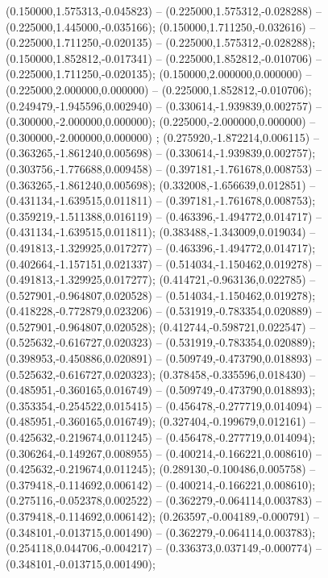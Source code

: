  (0.150000,1.575313,-0.045823) -- (0.225000,1.575312,-0.028288) -- (0.225000,1.445000,-0.035166);
 (0.150000,1.711250,-0.032616) -- (0.225000,1.711250,-0.020135) -- (0.225000,1.575312,-0.028288);
 (0.150000,1.852812,-0.017341) -- (0.225000,1.852812,-0.010706) -- (0.225000,1.711250,-0.020135);
 (0.150000,2.000000,0.000000) -- (0.225000,2.000000,0.000000) -- (0.225000,1.852812,-0.010706);
 (0.249479,-1.945596,0.002940) -- (0.330614,-1.939839,0.002757) -- (0.300000,-2.000000,0.000000);
 (0.225000,-2.000000,0.000000) -- (0.300000,-2.000000,0.000000) ;
 (0.275920,-1.872214,0.006115) -- (0.363265,-1.861240,0.005698) -- (0.330614,-1.939839,0.002757);
 (0.303756,-1.776688,0.009458) -- (0.397181,-1.761678,0.008753) -- (0.363265,-1.861240,0.005698);
 (0.332008,-1.656639,0.012851) -- (0.431134,-1.639515,0.011811) -- (0.397181,-1.761678,0.008753);
 (0.359219,-1.511388,0.016119) -- (0.463396,-1.494772,0.014717) -- (0.431134,-1.639515,0.011811);
 (0.383488,-1.343009,0.019034) -- (0.491813,-1.329925,0.017277) -- (0.463396,-1.494772,0.014717);
 (0.402664,-1.157151,0.021337) -- (0.514034,-1.150462,0.019278) -- (0.491813,-1.329925,0.017277);
 (0.414721,-0.963136,0.022785) -- (0.527901,-0.964807,0.020528) -- (0.514034,-1.150462,0.019278);
 (0.418228,-0.772879,0.023206) -- (0.531919,-0.783354,0.020889) -- (0.527901,-0.964807,0.020528);
 (0.412744,-0.598721,0.022547) -- (0.525632,-0.616727,0.020323) -- (0.531919,-0.783354,0.020889);
 (0.398953,-0.450886,0.020891) -- (0.509749,-0.473790,0.018893) -- (0.525632,-0.616727,0.020323);
 (0.378458,-0.335596,0.018430) -- (0.485951,-0.360165,0.016749) -- (0.509749,-0.473790,0.018893);
 (0.353354,-0.254522,0.015415) -- (0.456478,-0.277719,0.014094) -- (0.485951,-0.360165,0.016749);
 (0.327404,-0.199679,0.012161) -- (0.425632,-0.219674,0.011245) -- (0.456478,-0.277719,0.014094);
 (0.306264,-0.149267,0.008955) -- (0.400214,-0.166221,0.008610) -- (0.425632,-0.219674,0.011245);
 (0.289130,-0.100486,0.005758) -- (0.379418,-0.114692,0.006142) -- (0.400214,-0.166221,0.008610);
 (0.275116,-0.052378,0.002522) -- (0.362279,-0.064114,0.003783) -- (0.379418,-0.114692,0.006142);
 (0.263597,-0.004189,-0.000791) -- (0.348101,-0.013715,0.001490) -- (0.362279,-0.064114,0.003783);
 (0.254118,0.044706,-0.004217) -- (0.336373,0.037149,-0.000774) -- (0.348101,-0.013715,0.001490);
